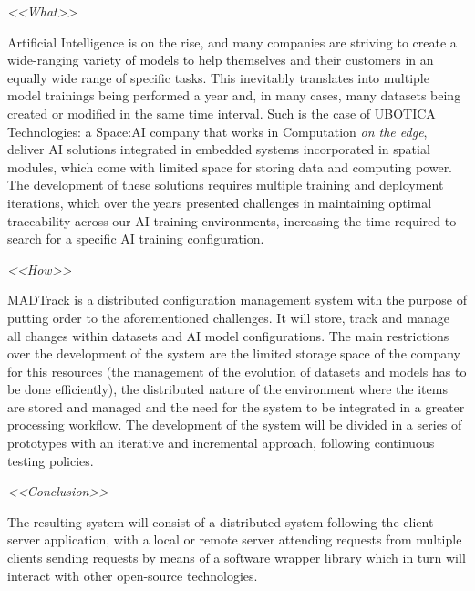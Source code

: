 \pagestyle{plain}	%



\begin{resumenAlt}[english]{\tituloCortoAlt} 

\emph{<<What>>}

Artificial Intelligence is on the rise, and many companies are striving to create a wide-ranging variety of models to help themselves and their customers in an equally wide range of specific tasks. This inevitably translates into multiple model trainings being performed a year and, in many cases, many datasets being created or modified in the same time interval. 
Such is the case of UBOTICA Technologies: a Space:AI company that works in Computation \emph{on the edge}, deliver AI solutions integrated in embedded systems incorporated in spatial modules, which come with limited space for storing data and computing power. The development of these solutions requires multiple training and deployment iterations,
which over the years presented challenges in maintaining optimal traceability across our AI training environments, increasing the time required to search for a specific AI training configuration. 


\emph{<<How>>}

MADTrack is a distributed configuration management system with the purpose of putting order to the aforementioned challenges. It will store, track and manage all changes within datasets and AI model configurations. The main 
restrictions over the development of the system are the limited storage space of the company for this resources (the management of the evolution of datasets and models has to be done efficiently), the distributed nature of the environment where the items 
are stored and managed and the need for the system to be integrated in a greater processing workflow. The development of the system will be divided in a series of prototypes with an iterative and incremental approach, following continuous testing policies.



\emph{<<Conclusion>>}

The resulting system will consist of a distributed system following the client-server application, with a local or remote server attending requests from multiple clients sending requests by means of a software wrapper library which in turn will interact with other open-source technologies.

\end{resumenAlt}

